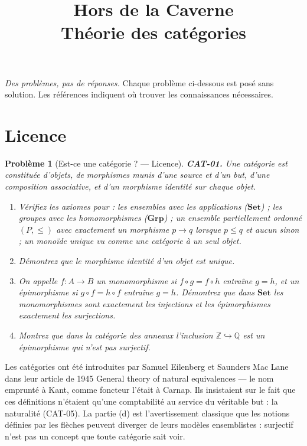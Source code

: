 \documentclass[11pt]{article}
\title{Hors de la Caverne \\ \Large Théorie des catégories}
\author{}
\date{}
\newtheorem{problem}{Problème}
\begin{document}
\maketitle
\noindent\emph{Des problèmes, pas de réponses.} Chaque problème ci-dessous est posé
sans solution. Les références indiquent où trouver les connaissances nécessaires.
\medskip


\section*{Licence}

\begin{problem}[{Est-ce une catégorie ? --- Licence}]
\textbf{CAT-01.} Une catégorie est constituée d'objets, de morphismes munis d'une
source et d'un but, d'une composition associative, et d'un morphisme identité sur chaque objet.
\begin{enumerate}
\item[(a)] Vérifiez les axiomes pour : les ensembles avec les applications ($ \mathbf{Set} $) ; les
groupes avec les homomorphismes ($ \mathbf{Grp} $) ; un ensemble partiellement ordonné
$ (P, \le) $ avec exactement un morphisme $ p \to q $ lorsque $ p \le q $ et aucun sinon ;
un monoïde unique vu comme une catégorie à un seul objet.
\item[(b)] Démontrez que le morphisme identité d'un objet est unique.
\item[(c)] On appelle
$ f\colon A \to B $ un \textit{monomorphisme} si $ f \circ g = f \circ h $ entraîne
$ g = h $, et un \textit{épimorphisme} si $ g \circ f = h \circ f $ entraîne $ g = h $.
Démontrez que dans $ \mathbf{Set} $ les monomorphismes sont exactement les injections et les
épimorphismes exactement les surjections.
\item[(d)] Montrez que dans la catégorie des anneaux l'inclusion
$ \mathbb{Z} \hookrightarrow \mathbb{Q} $ est un épimorphisme qui n'est pas surjectif.
\end{enumerate}

\end{problem}

\noindent Les catégories ont été introduites par Samuel Eilenberg et Saunders Mac Lane
dans leur article de 1945 \og{} General theory of natural equivalences \fg{} --- le nom emprunté à Kant,
comme \og{} foncteur \fg{} l'était à Carnap. Ils insistaient sur le fait que ces définitions n'étaient
qu'une comptabilité au service du véritable but : la naturalité (CAT-05). La partie (d) est
l'avertissement classique que les notions définies par les flèches peuvent diverger de leurs
modèles ensemblistes : \og{} surjectif \fg{} n'est pas un concept que toute catégorie sait voir.
\end{document}
